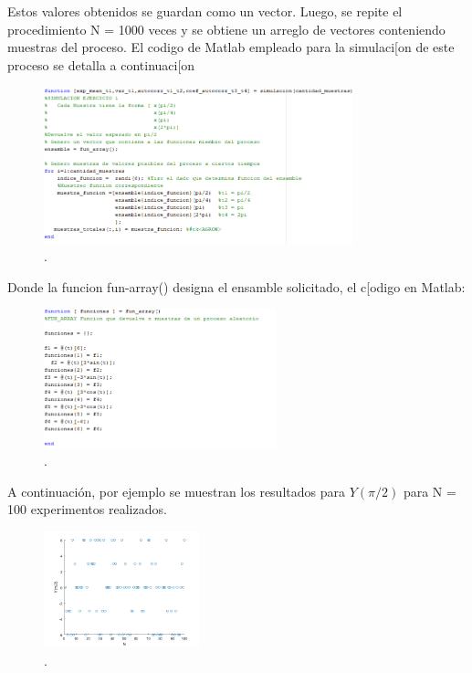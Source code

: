 Estos valores obtenidos se guardan como un vector. Luego, se repite el procedimiento N = 1000 veces 
y se obtiene un arreglo de vectores conteniendo muestras del proceso.
El codigo de Matlab empleado para la simulaci[on de este proceso se detalla a continuaci[on 
\\

\begin{figure}[H]
\centering
	\includegraphics[width=0.8\textwidth, trim = {0 0 0 0},clip]{./ImagenesEjercicio1/main1.png}
	\caption{.}
	\label{fig:main1}
\end{figure}

Donde la funcion fun-array() designa el ensamble solicitado, el c[odigo en Matlab:

\begin{figure}[H]
\centering
	\includegraphics[width=0.6\textwidth, trim = {0 0 0 0},clip]{./ImagenesEjercicio1/fun_array.png}
	\caption{.}
	\label{fig:fun_array}
\end{figure}

A continuación, por ejemplo se muestran los resultados para $Y(\pi/2)$ para N = 100 experimentos realizados.

\begin{figure}[H]
\centering
	\includegraphics[width=0.4\textwidth, trim = {0 0 0 0},clip]{./ImagenesEjercicio1/ypi_2.png}
	\caption{.}
	\label{fig:ypi_2}
\end{figure}

